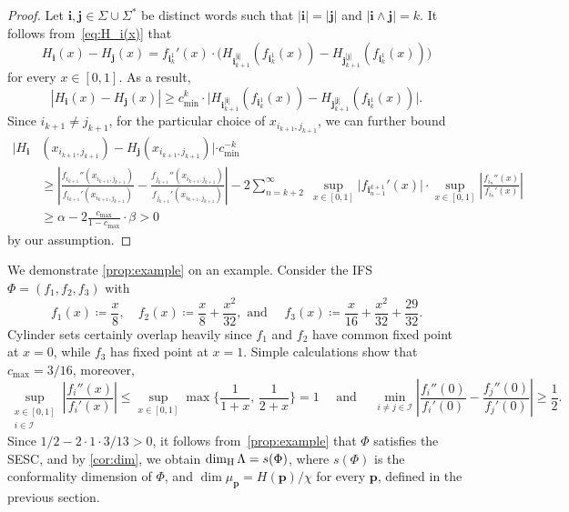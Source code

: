 \documentclass[11pt,]{article}
\def\cref#1{\ref{#1}}%
\theoremstyle{definition}
\theoremstyle{remark}
\newcommand{\0}{\mathbf{0}}
\newcommand{\bi}{\mathbf{i}}
\newcommand{\bj}{\mathbf{j}}
\begin{document}
\begin{proof}
  Let $\bi,\bj \in\Sigma\cup\Sigma^*$ be distinct words such that $|\bi|=|\bj|$ and $|\bi\wedge \bj|=k$. It
  follows from~\cref{eq:H_i(x)} that
  \begin{equation*}
    H_{\bi}(x)-H_{\bj}(x) = f_{\bi_k^1}'(x)\cdot \big( H_{\bi_{k+1}^{|\bi|}}(f_{\bi_k^1}(x)) -
    H_{\bj_{k+1}^{|\bj|}}(f_{\bi_k^1}(x)) \big)
\end{equation*}
for every $x\in[0,1]$. As a result,
\begin{equation*}
|H_{\bi}(x)-H_{\bj}(x)| \geq c_{\min}^k\cdot \big| H_{\bi_{k+1}^{|\bi|}}(f_{\bi_k^1}(x)) -
H_{\bj_{k+1}^{|\bj|}}(f_{\bi_k^1}(x)) \big|.
\end{equation*}
Since $i_{k+1}\neq j_{k+1}$, for the particular choice of $x_{i_{k+1},j_{k+1}}$, we can further bound 
\begin{align*}
|H_{\bi}&(x_{i_{k+1},j_{k+1}}) - H_{\bj}(x_{i_{k+1},j_{k+1}})|\cdot c_{\min}^{-k} \\
&\geq \left| \frac{f_{i_{k+1}}''(x_{i_{k+1},j_{k+1}})}{f_{i_{k+1}}'(x_{i_{k+1},j_{k+1}})} -
\frac{f_{j_{k+1}}''(x_{i_{k+1},j_{k+1}})}{f_{j_{k+1}}'(x_{i_{k+1},j_{k+1}})} \right| - 2
\sum_{n=k+2}^{\infty}\; \sup_{x\in[0,1]} \big| f_{\bi_{n-1}^{k+1}}'(x) \big| \cdot \sup_{x\in[0,1]}
\left| \frac{f_{i_n}''(x)}{f_{i_n}'(x)} \right| \\
&\geq \alpha -  2\frac{c_{\max}}{1-c_{\max}}\cdot \beta >0
\end{align*}
by our assumption.
\end{proof}

We demonstrate \cref{prop:example} on an example. Consider the IFS $\Phi=(f_1,f_2,f_3)$ with
\begin{equation*}%
f_1(x)\coloneqq \frac{x}{8}, \quad f_2(x)\coloneqq \frac{x}{8} + \frac{x^2}{32}, \text{ and } \quad
f_3(x)\coloneqq \frac{x}{16} + \frac{x^2}{32} + \frac{29}{32}. 
\end{equation*}
Cylinder sets certainly overlap heavily since $f_1$ and $f_2$ have common fixed point at $x=0$,
while $f_3$ has fixed point at $x=1$. Simple calculations show that $c_{\max}=3/16$, moreover,
\begin{equation*}
\sup_{\substack{x\in[0,1] \\ i\in\mathcal{I}}} \left| \frac{f_i''(x)}{f_i'(x)} \right| \leq
\sup_{x\in[0,1]} \max\Big\{\frac{1}{1+x},\, \frac{1}{2+x} \Big\} = 1 \quad\text{ and }\quad
\min_{i\neq j\in\mathcal{I}}\left| \frac{f_i''(0)}{f_i'(0)} - \frac{f_j''(0)}{f_j'(0)} \right| \geq
\frac{1}{2} .
\end{equation*}
Since $1/2-2\cdot 1\cdot 3/13>0$, it follows from~\cref{prop:example} that $\Phi$ satisfies the
SESC, and by \cref{cor:dim}, we obtain $\dim_{\rm H}\Lambda=s(\Phi)$, where $s(\Phi)$ is the
conformality dimension of $\Phi$, and $\dim \mu_{\mathbf{p}} =  H(\mathbf{p})/\chi$ for
every $\mathbf{p}$, defined in the previous section. 
\end{document}
